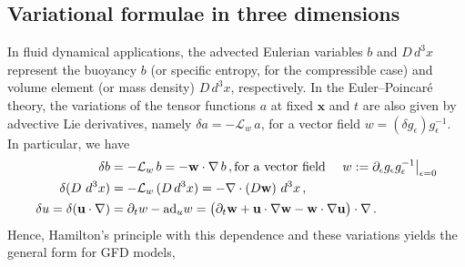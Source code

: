 \documentclass[11pt, oneside]{article}   	%
\numberwithin{equation}{section}
\theoremstyle{plain}
\theoremstyle{definition}
\theoremstyle{remark}
\newcommand{\<}{\langle}
\renewcommand{\>}{\rangle}
\begin{document}
\subsection{Variational formulae in three dimensions}  \label{sec-2.1}
In fluid dynamical applications, the advected Eulerian variables $b$
and $D\,d^3x$ represent the buoyancy $b$ (or specific entropy, for the
compressible case) and volume element (or mass density) $D\,d^3x$,
respectively. In the Euler--Poincar\'e theory, the variations of the tensor
functions $a$ at fixed $\mathbf{x}$ and $t$ are also given by advective Lie
derivatives, namely
$\delta a = - \mathcal{L}_w\,a$, for a vector field $w=(\delta g_\epsilon) g_\epsilon^{-1}$.
In particular, we have
\begin{align}
\begin{split}
\delta b
&= - \mathcal{L}_w\, b = -\mathbf{w}\cdot\nabla\,b\,,  \hfil \hbox{for a vector field }\quad w:=\partial_\epsilon g_\epsilon g_\epsilon^{-1}\big|_{\epsilon=0}
\\
\delta (D\ d^3x)&=- \mathcal{L}_w\,(D\,d^3x)
= -\nabla\cdot(D\mathbf{w})\ d^3x\,,
\\
\delta u = \delta(\mathbf{u}\cdot\nabla) &= \partial_t w - \mathrm{ad}_u w 
= \big(\partial_t \mathbf{w} + \mathbf{u}\cdot\nabla \mathbf{w} - \mathbf{w}\cdot\nabla \mathbf{u} \big)\cdot\nabla\,.
\\ 
\end{split}
\label{vars: u-D-b}
\end{align}
Hence, Hamilton's principle with this
dependence and these variations yields the general form for GFD models, 
%
\end{document}
